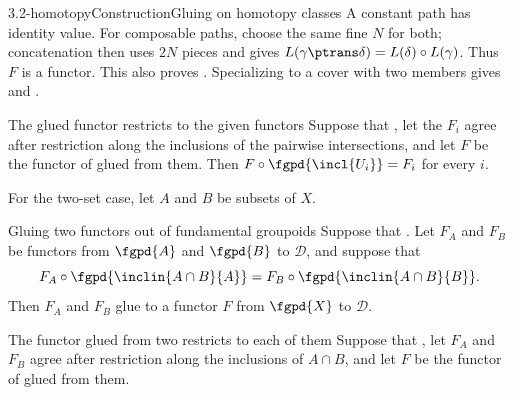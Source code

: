 \begin{proofpassage}{3.2-homotopy}{Construction}{Gluing on homotopy classes}
A constant path has identity value.  For composable paths, choose the
same fine $N$ for both; concatenation then uses $2N$ pieces and gives
$L(\gamma\ptrans\delta)=L(\delta)\circ L(\gamma)$.
Thus $F$ is a functor.
This also proves .  Specializing to a cover with two members
gives  and .
\end{proofpassage}

\begin{proposition}[id=3.3]{The glued functor restricts to the given functors}
Suppose that \hypCoverFamily, let the $F_{i}$ agree after restriction along the
inclusions of the pairwise intersections, and let $F$ be the functor of
 glued from them.  Then $F \circ \fgpd{\incl{U_{i}}} = F_{i}$ for
every $i$.
\end{proposition}

For the two-set case, let $A$ and $B$ be subsets of $X$.

\begin{definition}[id=3.4]{Gluing two functors out of fundamental groupoids}
Suppose that \hypCoverTwo.  Let $F_{A}$ and $F_{B}$ be functors from
$\fgpd{A}$ and $\fgpd{B}$ to $\mathcal{D}$, and suppose that
\[
  F_{A} \circ \fgpd{\inclin{A \cap B}{A}}
    = F_{B} \circ \fgpd{\inclin{A \cap B}{B}}.
\]
Then $F_{A}$ and $F_{B}$ glue to a functor $F$ from $\fgpd{X}$ to
$\mathcal{D}$.
\end{definition}

\begin{proposition}[id=3.5]{The functor glued from two restricts to each of them}
Suppose that \hypCoverTwo, let $F_{A}$ and $F_{B}$ agree after restriction along
the inclusions of $A \cap B$, and let $F$ be the functor of  glued
from them.
\end{proposition}
